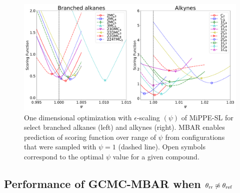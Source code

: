 \documentclass[journal=jced,manuscript=article]{achemso}
\begin{document}

	\begin{figure}[htb!]
		\centering
		\includegraphics[width=6.4in]{Optimal_epsilon_scaling.pdf}
		\caption{One dimensional optimization with $\epsilon$-scaling $(\psi)$ of MiPPE-SL for select branched alkanes (left) and alkynes (right). MBAR enables prediction of scoring function over range of $\psi$ from configurations that were sampled with $\psi = 1$ (dashed line). Open symbols correspond to the optimal $\psi$ value for a given compound.}
		\label{fig:epsilon_scaling}
	\end{figure}

 

\subsection{Performance of GCMC-MBAR when $\theta_{\rm rr} \not\approx \theta_{\rm ref}$} \label{sec: litFF}
\end{document}
